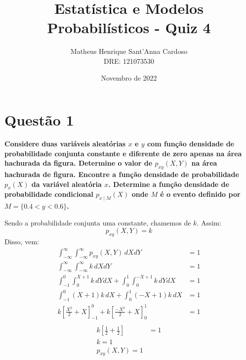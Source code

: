 \documentclass[a5paper]{report}
\title{Estatística e Modelos Probabilísticos - Quiz 4}
\author{
	Matheus Henrique Sant'Anna Cardoso\\
	DRE: 121073530
}
\date{Novembro de 2022}
\begin{document}
    \maketitle \newpage

\section*{Questão 1}
\textbf{Considere duas variáveis aleatórias $x$ e $y$ com função densidade de probabilidade conjunta constante e diferente de zero apenas na área hachurada da figura. Determine o valor de $p_{xy}(X, Y)$ na área hachurada de figura. Encontre a função densidade de probabilidade $p_x(X)$ da variável aleatória $x$. Determine a função densidade de probabilidade condicional $p_{x \mid M}(X)$ onde $M$ é o evento definido por $M = \{0.4 < y < 0.6\}$.}

\begin{center}
\end{center}

Sendo a probabilidade conjunta uma constante, chamemos de $k$. Assim:
\[p_{xy}(X, Y) = k\]
Disso, vem:
\begin{align*}
    \int_{-\infty}^{\infty} \int_{-\infty}^{\infty} p_{xy}(X, Y) \, dX dY &= 1 \\
    \int_{-\infty}^{\infty} \int_{-\infty}^{\infty} k \, dX dY &= 1 \\
    \int_{-1}^{0} \int_{0}^{X + 1} k \, dY dX + \int_{0}^{1} \int_{0}^{-X + 1} k \, dY dX &= 1 \\
    \int_{-1}^{0} (X + 1)k \, dX + \int_{0}^{1} (-X + 1) k \, dX &= 1 \\
    k \left[\frac{X^2}{2} + X\right]_{-1}^{0} + k \left[\frac{-X^2}{2} + X\right]_{0}^{1} &= 1 \\
\end{align*}
\begin{align*}    
    k \left[\frac{1}{2} + \frac{1}{2}\right] &= 1 \\
    k = 1\\
    \boxed{p_{xy}(X, Y) = 1}
\end{align*}
\end{document}
